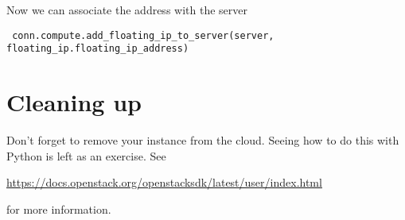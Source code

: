 \documentclass{article}
\begin{document}
Now we can associate the address with the server

\begin{verbatim}
 conn.compute.add_floating_ip_to_server(server, floating_ip.floating_ip_address)
\end{verbatim}

\section{Cleaning up}
Don't forget to remove your instance from the cloud. Seeing how to do this with Python is left as an exercise. See

\url{https://docs.openstack.org/openstacksdk/latest/user/index.html}

for more information.
\end{document}
